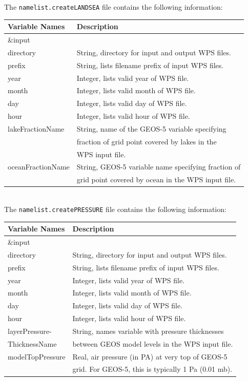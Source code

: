 \newpage

The \texttt{namelist.createLANDSEA} file contains the following information:

\begin{tabular}{|l|l|} \hline
Variable Names & Description \\ \hline
\&input          & \\ \hline
directory & String, directory for input and output WPS files. \\ \hline
prefix & String, lists filename prefix of input WPS files. \\ \hline
year & Integer, lists valid year of WPS file. \\ \hline
month & Integer, lists valid month of WPS file. \\ \hline
day & Integer, lists valid day of WPS file. \\ \hline
hour & Integer, lists valid hour of WPS file. \\ \hline
lakeFractionName & String, name of the GEOS-5 variable specifying  \\
  & fraction of grid point covered by lakes in the \\
  & WPS input file. \\ \hline
oceanFractionName & String, GEOS-5 variable name specifying fraction of \\
  & grid point covered by ocean in the WPS input file. \\ \hline
\end{tabular} \\

The \texttt{namelist.createPRESSURE} file contains the following information:

\begin{tabular}{|l|l|} \hline
Variable Names & Description \\ \hline
\&input          & \\ \hline
directory & String, directory for input and output WPS files. \\ \hline
prefix & String, lists filename prefix of input WPS files. \\ \hline
year & Integer, lists valid year of WPS file. \\ \hline
month & Integer, lists valid month of WPS file. \\ \hline
day & Integer, lists valid day of WPS file. \\ \hline
hour & Integer, lists valid hour of WPS file. \\ \hline
layerPressure- & String, names variable with pressure thicknesses \\
ThicknessName  &  between GEOS model levels in the WPS input file. \\ \hline
modelTopPressure & Real, air pressure (in PA) at very top of GEOS-5  \\
 & grid. For GEOS-5, this is typically 1 Pa (0.01 mb). \\ \hline
\end{tabular} \\

